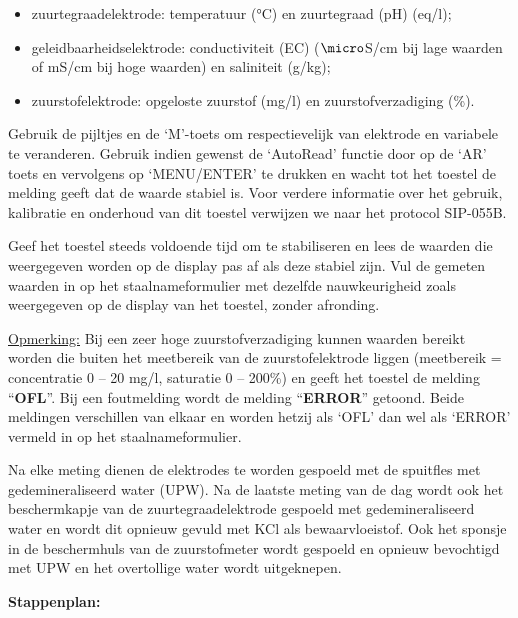 \documentclass[
]{scrreprt}
\begin{document}
\begin{itemize}
\item
  zuurtegraadelektrode: temperatuur (°C) en zuurtegraad (pH) (eq/l);
\item
  geleidbaarheidselektrode: conductiviteit (EC) (\(\micro\)S/cm bij lage waarden of mS/cm bij hoge waarden) en saliniteit (g/kg);
\item
  zuurstofelektrode: opgeloste zuurstof (mg/l) en zuurstofverzadiging (\%).
\end{itemize}

Gebruik de pijltjes en de `M'-toets om respectievelijk van elektrode en variabele te veranderen.
Gebruik indien gewenst de `AutoRead' functie door op de `AR' toets en vervolgens op `MENU/ENTER' te drukken en wacht tot het toestel de melding geeft dat de waarde stabiel is.
Voor verdere informatie over het gebruik, kalibratie en onderhoud van dit toestel verwijzen we naar het protocol SIP-055B.

Geef het toestel steeds voldoende tijd om te stabiliseren en lees de waarden die weergegeven worden op de display pas af als deze stabiel zijn.
Vul de gemeten waarden in op het staalnameformulier met dezelfde nauwkeurigheid zoals weergegeven op de display van het toestel, zonder afronding.

\ul{Opmerking:} Bij een zeer hoge zuurstofverzadiging kunnen waarden bereikt worden die buiten het meetbereik van de zuurstofelektrode liggen (meetbereik = concentratie 0 -- 20 mg/l, saturatie 0 -- 200\%) en geeft het toestel de melding ``\textbf{OFL}''.
Bij een foutmelding wordt de melding ``\textbf{ERROR}'' getoond.
Beide meldingen verschillen van elkaar en worden hetzij als `OFL' dan wel als `ERROR' vermeld in op het staalnameformulier.

Na elke meting dienen de elektrodes te worden gespoeld met de spuitfles met gedemineraliseerd water (UPW).
Na de laatste meting van de dag wordt ook het beschermkapje van de zuurtegraadelektrode gespoeld met gedemineraliseerd water en wordt dit opnieuw gevuld met KCl als bewaarvloeistof.
Ook het sponsje in de beschermhuls van de zuurstofmeter wordt gespoeld en opnieuw bevochtigd met UPW en het overtollige water wordt uitgeknepen.

\textbf{Stappenplan:}
\end{document}
